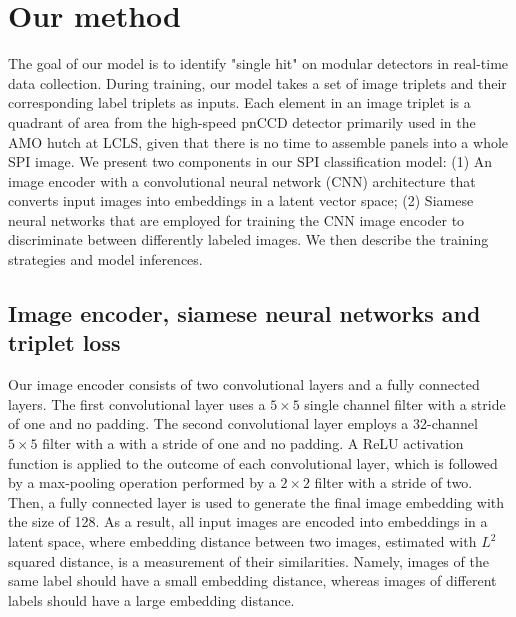 \section{Our method}

The goal of our model is to identify "single hit" on modular detectors in
real-time data collection.  During training, our model takes a set of image
triplets and their corresponding label triplets as inputs.  Each element in an
image triplet is a quadrant of area from the high-speed pnCCD detector primarily
used in the AMO hutch at LCLS, given that there is no time to assemble panels
into a whole SPI image.  We present two components in our SPI classification
model: (1) An image encoder with a convolutional neural network (CNN)
architecture that converts input images into embeddings in a latent vector space;
(2) Siamese neural networks that are employed for training the CNN image encoder
to discriminate between differently labeled images.  We then describe the
training strategies and model inferences.  


\subsection{Image encoder, siamese neural networks and triplet loss}

Our image encoder consists of two convolutional layers and a fully connected
layers.  The first convolutional layer uses a $5 \times 5$ single channel filter
with a stride of one and no padding.  The second convolutional layer employs a
32-channel $5 \times 5$ filter with a with a stride of one and no padding.  A
ReLU activation function is applied to the outcome of each convolutional layer,
which is followed by a max-pooling operation performed by a $2\times 2$ filter
with a stride of two.  Then, a fully connected layer is used to generate the
final image embedding with the size of 128.  As a result, all input images are
encoded into embeddings in a latent space, where embedding distance between two
images, estimated with $L^2$ squared distance, is a measurement of their
similarities.  Namely, images of the same label should have a small embedding
distance, whereas images of different labels should have a large embedding
distance.  

